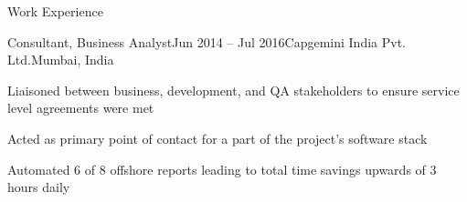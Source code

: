 \begin{rSection}{Work Experience}

\begin{rSubsection}{Consultant, Business Analyst}{Jun 2014 -- Jul 2016}{Capgemini India Pvt. Ltd.}{Mumbai, India}
\item{Liaisoned between business, development, and QA stakeholders to ensure service level agreements were met}
\item{Acted as primary point of contact for a part of the project's software stack}
\item{Automated 6 of 8 offshore reports leading to total time savings upwards of 3 hours daily}
\end{rSubsection}

\end{rSection}